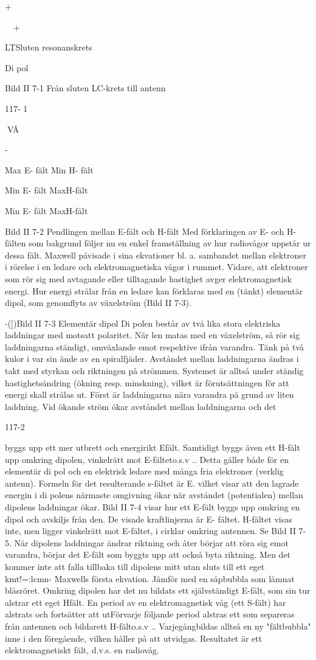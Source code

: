 +

~~+

LTSluten
resonanskrets

Di pol

Bild II 7-1 Från sluten LC-krets till antenn

117- 1

VÅ

-

Max E- fält
Min H- fält

Min E- fält
MaxH-fält

Min E- fält
MaxH-fält

Bild II 7-2 Pendlingen mellan E-fält och H-fält
Med förklaringen av E- och H-fälten som
bakgrund följer nu en enkel framställning av
hur radiovågor uppstår ur dessa fält.
Maxwell påvisade i sina ekvationer bl. a.
sambandet mellan elektroner i rörelse i en
ledare och elektromagnetiska vågor i rummet. Vidare, att elektroner som rör sig med
avtagande eller tilltagande hastighet avger
elektromagnetisk energi.
Hur energi strålar från en ledare kan förklaras med en (tänkt) elementär dipol, som
genomflyts av växelström (Bild II 7-3).

-(])Bild II 7-3 Elementär dipol
Di polen består av två lika stora elektriska
laddningar med motsatt polaritet. När
len matas med en växelström, så rör sig
laddningarna ständigt, omväxlande emot
respektive ifrån varandra. Tänk på två kulor
i var sin ände av en spiralfjäder. Avståndet
mellan laddningarna ändras i takt med styrkan och riktningen på strömmen. Systemet
är alltså under ständig hastighetsändring
(ökning resp. minskning), vilket är förutsättningen för att energi skall strålas ut.
Först är laddningarna nära varandra på
grund av liten laddning. Vid ökande ström
ökar avståndet mellan laddningarna och det

117-2

byggs upp ett mer utbrett och energirikt Efält. Samtidigt byggs även ett H-fält upp
omkring dipolen, vinkelrätt mot E-fälteto.s.v ..
Detta gäller både för en elementär di pol och
en elektrisk ledare med många fria elektroner (verklig antenn).
Formeln för det resulterande s-fältet är
E. vilket visar att den lagrade energin
i di polens närmaste omgivning ökar när avståndet (potentialen) mellan dipolens laddningar ökar.
Bild II 7-4 visar hur ett E-fält byggs upp
omkring en dipol och avskiljs från den. De
visade kraftlinjerna är E- fältet. H-fältet visas
inte, men ligger vinkelrätt mot E-fältet, i cirklar omkring antennen. Se Bild II 7-5.
När dipolens laddningar ändrar riktning
och åter börjar att röra sig emot varandra,
börjar det E-fält som byggts upp att också
byta riktning. Men det kommer inte att falla
tillbaka till dipolens mitt utan sluts till ett eget
kmt!=:lcmn- Maxwells första ekvation. Jämför
med en såpbubbla som lämnat blåsröret.
Omkring dipolen har det nu bildats ett självständigt E-fält, som sin tur alstrar ett eget Hfält.
En period av en elektromagnetisk våg
(ett S-fält) har alstrats och fortsätter att utFörvarje följande period alstras ett
som separeras från antennen och
bildarett
H-fälto.s.v .. Varjegångbildas
alltså en ny "fältbubbla" inne i den föregående, vilken håller på att utvidgas.
Resultatet är ett elektromagnetiskt fält,
d.v.s. en radiovåg.

